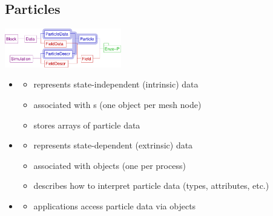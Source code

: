 \NEWSEC

\subsection{Particles}

\begin{frame}[fragile,label=ss-particles] 
\begin{center}
\includegraphics[width=2in]{data-classes-particle.pdf}
\end{center}

\begin{itemize}
\item {}
\begin{itemize}
\item represents state-independent (intrinsic) data
\item associated with s (one object per mesh node)
\item stores arrays of particle data
\end{itemize}
\item {}
\begin{itemize}
\item represents state-dependent (extrinsic) data
\item associated with  objects (one per process)
\item describes how to interpret particle data (types, attributes, etc.)
\end{itemize}
\item {}
\begin{itemize}
\item applications access particle data via  objects
\end{itemize}
\end{itemize}
\end{frame}

